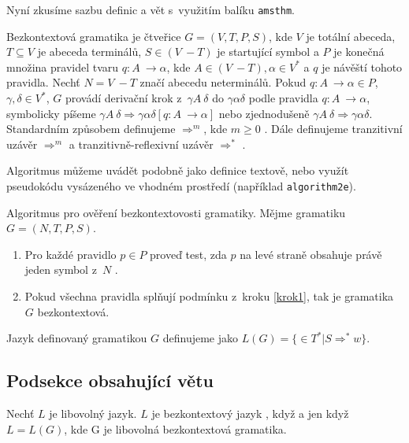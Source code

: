 \documentclass[a4paper, 11pt, twocolumn] {article}
\begin{document}
Nyní zkusíme sazbu definic a vět s~využitím balíku \texttt{amsthm}.

\begin{definicia} \label{d11} Bezkontextová gramatika \textup{je čtveřice $G=(V,T,P,S)$, kde $V$ je totální abeceda,
$T \subseteq V$ je abeceda terminálů, $S \in (V~- T)$ je startující symbol a $P$  je konečná množina} pravidel
\textup{tvaru $q \colon A~\rightarrow \alpha$, kde $A \in  (V~- T), \alpha \in V^*$ a $q$ je návěští tohoto pravidla. Nechť $N = V~- T $ značí abecedu neterminálů.
Po\-kud $q \colon A~\rightarrow \alpha \in P$,$ \gamma, \delta \in V^*$, $G$ provádí derivační krok z~$\gamma A~\delta$ do $\gamma \alpha \delta$ podle pravidla $q \colon A~\rightarrow \alpha$, symbolicky píšeme 
 $\gamma A~\delta \Rightarrow \gamma \alpha \delta [q \colon A~\rightarrow \alpha]$ nebo zjednodušeně $\gamma A~\delta \Rightarrow \gamma \alpha \delta$. Standardním způsobem definujeme $\Rightarrow^m$, kde $m \geq 0$ . Dále definujeme 
tranzitivní uzávěr $\Rightarrow^m$ a tranzitivně-reflexivní uzávěr $\Rightarrow^*$ .}
\end{definicia}

Algoritmus můžeme uvádět podobně jako definice textově, nebo využít pseudokódu vysázeného ve vhodném prostředí (například \texttt{algorithm2e}).

\begin{algoritmus} \label{a1} Algoritmus pro ověření bezkontextovosti gramatiky. Mějme gramatiku $G = (N, T, P, S)$.
\begin{enumerate}
 \item \label{krok1} Pro každé pravidlo $p \in P$ proveď test, zda $p$ na levé straně obsahuje právě jeden symbol z~$N$ .
 \item Po\-kud všechna pravidla splňují podmínku z~kroku \ref{krok1}, tak je gramatika $G$ bezkontextová.
\end{enumerate}
\end{algoritmus}

\begin{definicia}
\textup{Jazyk definovaný gramatikou $G$ definujeme jako $L(G) = \{ \in T^*|S \Rightarrow^* w\}$.}
\end{definicia}

\subsection{Podsekce obsahující větu}

\begin{definicia} \textup{Nechť $L$ je libovolný jazyk. $L$ je} bezkontextový jazyk \textup{, když a jen když $L=L(G)$, kde G je libovolná bezkontextová gramatika.}
\end{definicia}
\end{document}
